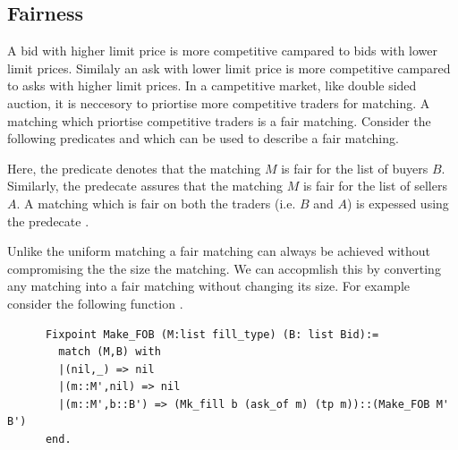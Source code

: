 \documentclass[a4paper,UKenglish,cleveref, autoref]{lipics-v2019}
\begin{document}
\subsection{Fairness}  

A bid with higher limit price is more competitive campared to bids with lower limit prices. Similaly an ask with lower limit price is more competitive campared to asks with higher limit prices. In a campetitive market, like double sided auction, it is neccesory to priortise more competitive traders for matching. A matching which priortise competitive traders is a fair matching. Consider the following predicates  and   which can be used to describe a fair matching. 

\begin{definition}
 \end{definition}
\begin{definition}
\end{definition}
\begin{definition}
\end{definition}

Here, the predicate   denotes that the matching $M$  is fair for the list of buyers $B$. Similarly,  the predecate  assures that the matching $M$  is fair for the list of sellers $A$.  A matching which is fair on both the traders (i.e. $B$ and $A$) is expessed using the predecate .

Unlike the uniform matching a fair matching can always be achieved without compromising the the size the matching. We can accopmlish this by converting any matching into a fair matching without changing its size. For example consider the following function .

\begin{verbatim}
	  Fixpoint Make_FOB (M:list fill_type) (B: list Bid):=
	    match (M,B) with 
	    |(nil,_) => nil
	    |(m::M',nil) => nil
	    |(m::M',b::B') => (Mk_fill b (ask_of m) (tp m))::(Make_FOB M' B')
	  end.
\end{verbatim}
\end{document}
